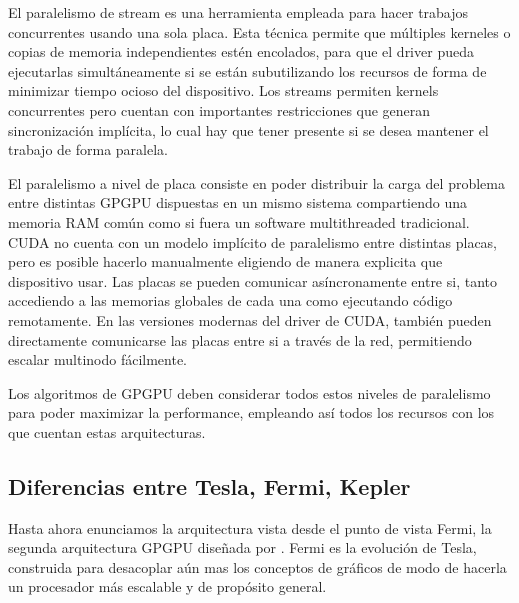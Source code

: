 El paralelismo de stream es una herramienta empleada para hacer trabajos concurrentes usando una
sola placa. Esta t\'ecnica permite que m\'ultiples kerneles o copias de memoria independientes est\'en
encolados, para que el driver pueda ejecutarlas simult\'aneamente si se est\'an subutilizando
los recursos de forma de minimizar tiempo ocioso del dispositivo. Los streams permiten kernels
concurrentes pero cuentan con importantes restricciones que generan sincronizaci\'on impl\'icita,
lo cual hay que tener presente si se desea mantener el trabajo de forma paralela.

El paralelismo a nivel de placa consiste en poder distribuir la carga del problema entre distintas
GPGPU dispuestas en un mismo sistema compartiendo una memoria RAM com\'un como si fuera un software
multithreaded tradicional. CUDA no cuenta con un modelo impl\'icito de paralelismo entre distintas placas,
pero es posible hacerlo manualmente eligiendo de manera explicita que dispositivo usar. Las placas
se pueden comunicar as\'incronamente entre si, tanto accediendo a las memorias globales de cada una
como ejecutando c\'odigo remotamente. En las versiones modernas del driver de CUDA, tambi\'en pueden
directamente comunicarse las placas entre si a trav\'es de la red, permitiendo escalar multinodo f\'acilmente.

Los algoritmos de GPGPU deben considerar todos estos niveles de paralelismo para poder maximizar la
performance, empleando as\'i todos los recursos con los que cuentan estas arquitecturas.

\subsection{Diferencias entre Tesla, Fermi, Kepler}

Hasta ahora enunciamos la arquitectura vista desde el punto de vista Fermi, la segunda arquitectura GPGPU dise\~nada por \nvidia{}.
Fermi es la evoluci\'on de Tesla, construida para desacoplar a\'un mas los conceptos de gr\'aficos de modo de hacerla un procesador m\'as escalable y de prop\'osito general.


